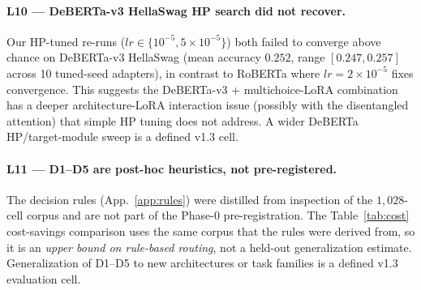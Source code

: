 \documentclass[11pt]{article}
\begin{document}
\paragraph{L10 — DeBERTa-v3 HellaSwag HP search did not recover.} Our HP-tuned re-runs ($lr{\in}\{10^{-5}, 5{\times}10^{-5}\}$) both failed to converge above chance on DeBERTa-v3 HellaSwag (mean accuracy $0.252$, range $[0.247, 0.257]$ across 10 tuned-seed adapters), in contrast to RoBERTa where $lr{=}2{\times}10^{-5}$ fixes convergence. This suggests the DeBERTa-v3 + multichoice-LoRA combination has a deeper architecture-LoRA interaction issue (possibly with the disentangled attention) that simple HP tuning does not address. A wider DeBERTa HP/target-module sweep is a defined v1.3 cell.

\paragraph{L11 — D1--D5 are post-hoc heuristics, not pre-registered.} The decision rules (App.~\ref{app:rules}) were distilled from inspection of the $1{,}028$-cell corpus and are not part of the Phase-0 pre-registration. The Table~\ref{tab:cost} cost-savings comparison uses the same corpus that the rules were derived from, so it is an \emph{upper bound on rule-based routing}, not a held-out generalization estimate. Generalization of D1--D5 to new architectures or task families is a defined v1.3 evaluation cell.
\end{document}
